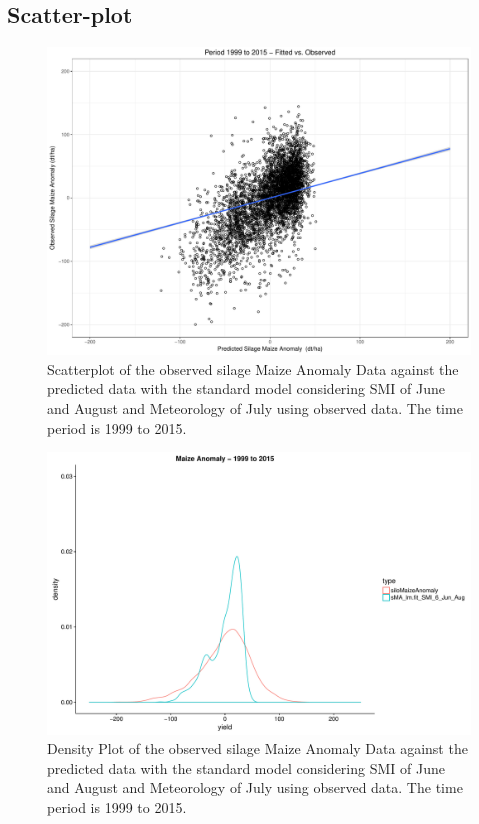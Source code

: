 \documentclass[12pt]{iopart}
\begin{document}
\subsection{Scatter-plot}

\label{scatter:1}

\begin{figure}
	\label{scatter:1f}
	\centering
	\includegraphics[width=1\textwidth]{figures/Train_1999-2015.pdf}
	\caption{Scatterplot of the observed silage Maize Anomaly Data against the predicted data with the standard model considering SMI of June and August and
		Meteorology of July using observed data. The time period is 1999 to 2015.}
\end{figure}


\begin{figure}
	\label{density:1f}
	\centering
	\includegraphics[width=1\textwidth]{figures/Density_19992015_Anomalies_sMA_lmfit_SMI_6_Jun_Aug.pdf}
	\caption{Density Plot of the observed silage Maize Anomaly Data against the predicted data with the standard model considering SMI of June and August and
		Meteorology of July using observed data. The time period is 1999 to 2015.}
\end{figure}
\end{document}

